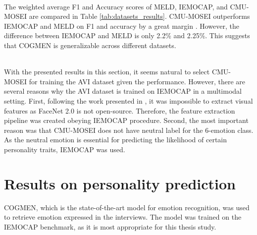 %
\\
The weighted average F1 and Accuracy scores of MELD, IEMOCAP, and CMU-MOSEI are compared in Table \ref{tab:datasets_results}. CMU-MOSEI outperforms IEMOCAP and MELD on F1 and accuracy by a great margin \cite{HP_Advanced}. However, the difference between IEMOCAP and MELD is only 2.2\% and 2.25\%. This suggests that COGMEN is generalizable across different datasets. 
%
\begin{table}[h]
\caption{Comparison of COGMEN performed on the three datasets.}
\centering
{}
\label{tab:datasets_results}
\end{table}
%
\\
With the presented results in this section, it seems natural to select CMU-MOSEI for training the AVI dataset given the performance. However, there are several reasons why the AVI dataset is trained on IEMOCAP in a multimodal setting. First, following the work presented in \cite{cmu-mosei_zadeh2018multimodal}, it was impossible to extract visual features as FaceNet 2.0 is not open-source. Therefore, the feature extraction pipeline was created obeying IEMOCAP procedure. Second, the most important reason was that CMU-MOSEI does not have neutral label for the 6-emotion class. As the neutral emotion is essential for predicting the likelihood of certain personality traits, IEMOCAP was used. 


\section{Results on personality prediction}
\label{sec:results_personality}
COGMEN, which is the state-of-the-art model for emotion recognition, was used to retrieve emotion expressed in the interviews. The model was trained on the IEMOCAP benchmark, as it is most appropriate for this thesis study. \\

